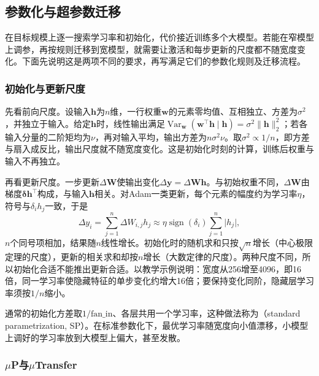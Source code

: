 \subsection{参数化与超参数迁移}
\label{sec:nlp-llm-parameter-scale}

在目标规模上逐一搜索学习率和初始化，代价接近训练多个大模型。若能在窄模型上调参，再按规则迁移到宽模型，就需要让激活和每步更新的尺度都不随宽度变化。下面先说明这是两项不同的要求，再写满足它们的参数化规则及迁移流程。

\subsubsection{初始化与更新尺度}
\label{sec:nlp-llm-init-update-scale}

先看前向尺度。设输入$\bm h$为$n$维，一行权重$\bm w$的元素零均值、互相独立、方差为$\sigma^2$，并独立于输入。给定$\bm h$时，线性输出满足$\operatorname{Var}_{\bm w}(\bm w^{\top}\bm h\mid\bm h)=\sigma^2\lVert\bm h\rVert_2^2$；若各输入分量的二阶矩均为$\nu$，再对输入平均，输出方差为$n\sigma^2\nu$。取$\sigma^2\propto1/n$，即方差与扇入成反比，输出尺度就不随宽度变化。这是初始化时刻的计算，训练后权重与输入不再独立。

再看更新尺度。一步更新$\Delta\bm W$使输出变化$\Delta\bm y=\Delta\bm W\bm h$。与初始权重不同，$\Delta\bm W$由梯度$\bm\delta\bm h^{\top}$构成，与输入$\bm h$相关。对Adam一类更新，每个元素的幅度约为学习率$\eta$，符号与$\delta_i h_j$一致，于是
\begin{equation*}
 \Delta y_i=\sum_{j=1}^{n}\Delta W_{i,j}h_j\approx\eta\operatorname{sign}(\delta_i)\sum_{j=1}^{n}\lvert h_j\rvert,
\end{equation*}
$n$个同号项相加，结果随$n$线性增长。初始化时的随机求和只按$\sqrt n$增长（中心极限定理的尺度），更新的相关求和却按$n$增长（大数定律的尺度）。两种尺度不同，所以初始化合适不能推出更新合适。以教学示例说明：宽度从256增至4096，即16倍，同一学习率使隐藏特征的单步变化约增大16倍；要保持变化同阶，隐藏层学习率须按$1/n$缩小。

通常的初始化方差取$1/\mathrm{fan\_in}$、各层共用一个学习率，这种做法称为（standard parametrization, SP）。在标准参数化下，最优学习率随宽度向小值漂移，小模型上调好的学习率放到大模型上偏大，甚至发散。

\subsubsection{\texorpdfstring{$\mu$P与$\mu$Transfer}{μP与μTransfer}}
\label{sec:nlp-llm-mup}

